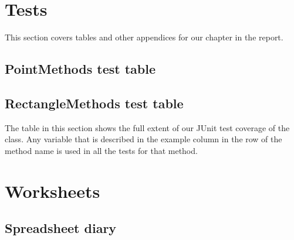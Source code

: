 \appendix
\appendixpage
\addappheadtotoc
\chapter{Tests}
This section covers tables and other appendices for our  chapter in
the report.
\section{PointMethods test table}
\label{APP-TE-PM}


\section{RectangleMethods test table}
\label{APP-TE-RM}

The table in this section shows the full extent of our JUnit test coverage of
the  class. Any variable that is described in the
example column in the row of the method name is used in all the tests for that
method.


\chapter{Worksheets}
\label{APP-WS}
\section{Spreadsheet diary}
\label{APP-SS}
